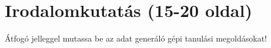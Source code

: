 


\section{Irodalomkutatás (15-20 oldal)}
Átfogó jelleggel mutassa be az adat generáló gépi tanulási megoldásokat!

